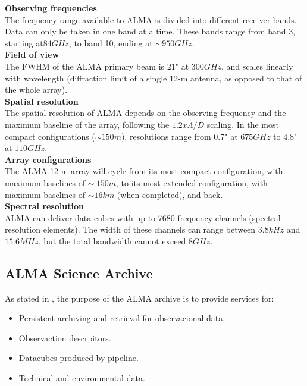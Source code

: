 \textbf{Observing frequencies}\\
The frequency range available to ALMA is divided into different receiver bands. Data can only be taken in one band at a time. These bands range from band 3, starting at$ 84 GHz$, to band 10, ending at $\sim950 GHz$.\\

\textbf{Field of view}\\
The FWHM of the ALMA primary beam is 21" at $300 GHz$, and scales linearly with wavelength (diffraction limit of a single 12-m antenna, as opposed to that of the whole array).\\

\textbf{Spatial resolution}\\
The spatial resolution of ALMA depends on the observing frequency and the maximum baseline of the array, following the $1.2 x \Lambda/D$ scaling. In the most compact configurations ($\sim150 m$), resolutions range from 0.7" at $675 GHz$ to 4.8" at $110 GHz$.\\

\textbf{Array configurations}\\
The ALMA 12-m array will cycle from its most compact configuration, with maximum baselines of $\sim~150 m$, to its most extended configuration, with maximum baselines of $\sim 16 km$ (when completed), and back.\\

\textbf{Spectral resolution}\\
ALMA can deliver data cubes with up to 7680 frequency channels (spectral resolution elements). The width of these channels can range between $3.8 kHz$ and $15.6 MHz$, but the total bandwidth cannot exceed $8 GHz$.\\

\subsection{ALMA Science Archive}

As stated in \cite{Etoka12}, the purpose of the ALMA archive is to provide services for:

\begin{itemize}
\item Persistent archiving and retrieval for observacional data.
\item Observaction descrpitors.
\item Datacubes produced by pipeline.
\item Technical and environmental data.
\end{itemize}


